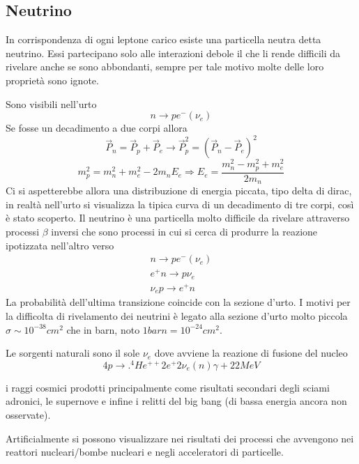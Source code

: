 \documentclass[12pt]{book}
\begin{document}
\subsection{Neutrino}
In corrispondenza di ogni leptone carico esiste una particella neutra detta neutrino. Essi partecipano solo alle interazioni debole il che li rende difficili da rivelare anche se sono abbondanti, sempre per tale motivo molte delle loro proprietà sono ignote.

Sono visibili nell'urto
\begin{equation}
	n \rightarrow p e^- ( \nu_e)
\end{equation}
Se fosse un decadimento a due corpi allora
\begin{equation}
	\vec P_n = \vec P_p + \vec P_e \longrightarrow \vec P^2_p = ( \vec P_n - \vec P_e )^2
\end{equation}
\begin{equation}
  m_p^2 = m_n^2 + m_e^2 - 2m_n E_e \Rightarrow E_e = \frac{m_n^2 - m_p^2 + m_e^2}{2 m_n}
\end{equation}
Ci si aspetterebbe allora una distribuzione di energia piccata, tipo delta di dirac, in realtà nell'urto si visualizza la tipica curva di un decadimento di tre corpi, così è stato scoperto. Il neutrino è una particella molto difficile da rivelare attraverso processi $\beta$ inversi che sono processi in cui si cerca di produrre la reazione ipotizzata nell'altro verso 
\begin{gather}
n \rightarrow p e^- (\nu_e)\\
e^+ n \rightarrow p \nu_e \\
 \nu_e p \rightarrow e^+ n	
\end{gather}
La probabilità dell'ultima transizione coincide con la sezione d'urto. I motivi per la difficolta di rivelamento dei neutrini è legato alla sezione d'urto molto piccola $\sigma \sim 10^{-38}cm^{2}$ che in barn, noto $1 barn = 10^{-24}cm^2$.

Le sorgenti naturali sono il sole $\nu_e$ dove avviene la reazione di fusione del nucleo 
\begin{equation}
	4 p \rightarrow .^4He^{++}2e^+ 2 \nu_e (n) \gamma + 22 MeV
\end{equation}

 i raggi cosmici prodotti principalmente come risultati secondari degli sciami adronici, le supernove e infine i relitti del big bang (di bassa energia ancora non osservate). 
 
 
 Artificialmente si possono visualizzare nei risultati dei processi che avvengono nei reattori nucleari/bombe nucleari e negli acceleratori di particelle.
 
\end{document}

